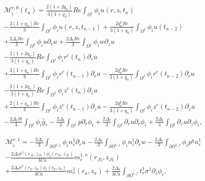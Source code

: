 \documentclass{article}
\begin{document}
\begin{equation}
\begin{array}{l} \mathcal{M}_i^{r,0}(t_n) = \frac{2(1 + 2q_n)}{3(1 + q_n)} Re \int_{\Omega^f} \phi_i u(r,z,t_n) \\ - \frac{2(1 + q_n)Re}{3} \int_{\Omega^f} \phi_i u(r,z,t_{n-1}) + \frac{2q_n^2 Re}{3(1 + q_n)} \int_{\Omega^f} \phi_i u(t_{n-2}) \\ + \frac{2\Delta_t Re}{3} \int_{\Omega^f} \phi_i u \partial_r u + \frac{2\Delta_t Re}{3} \int_{\Omega^f} \phi_i w \partial_z u \\ - \frac{2(1 + 2q_n)}{3(1 + q_n)} Re \int_{\Omega^f} \phi_i r^c(t_n) \partial_r u \\ + \frac{2(1 + q_n)Re}{3} \int_{\Omega^f} \phi_i r^c(t_{n-1}) \partial_r u - \frac{2q_n^2 Re}{3(1 + q_n)} \int_{\Omega^f} \phi_i r^c(t_{n-2}) \partial_r u \\ - \frac{2(1 + 2q_n)}{3(1 + q_n)} Re \int_{\Omega^f} \phi_i z^c(t_n) \partial_z u \\ + \frac{2(1 + q_n)Re}{3} \int_{\Omega^f} \phi_i z^c(t_{n-1}) \partial_z u - \frac{2q_n^2 Re}{3(1 + q_n)} \int_{\Omega^f} \phi_i z^c(t_{n-2}) \partial_z u \\ - \frac{2\Delta_t St}{3} \int_{\Omega^f} \phi_i \hat{g}_r - \frac{2\Delta_t}{3} \int_{\Omega^f} p \partial_r \phi_i + \frac{2\Delta_t}{3} \int_{\Omega^f} \partial_r u \partial_r \phi_i + \frac{2\Delta_t}{3} \int_{\Omega^f} \partial_z u \partial_z \phi_i, \end{array} \tag{4.61}
\end{equation}

\begin{equation}
\begin{array}{l} \mathcal{M}_i^{r,1} = -\frac{2\Delta_t}{3} \int_{\partial \Omega^{1,f}} \phi_i n_r^1 \partial_r u - \frac{2\Delta_t}{3} \int_{\partial \Omega^{1,f}} \phi_i n_z^1 \partial_r w - \frac{2\Delta_t}{3} \int_{\partial \Omega^{1,f}} \phi_i p^g n_r^1 \\ - \frac{2\Delta_t \sigma^1(r_{J1},z_{J1})\phi_i(r_{J1},z_{J1})}{3Ca} m_r^{1,n}(r_{J1},z_{J1}) \\ + \frac{2\Delta_t \sigma^1(r_a,z_a)\phi_i(r_a,z_a)}{3Ca} m_r^{1}(r_a,z_a) + \frac{2\Delta_t}{3Ca} \int_{\partial \Omega^{1,f}} t_r^1 \sigma^1 \partial_s \phi_i, \end{array} \tag{4.62}
\end{equation}
\end{document}
